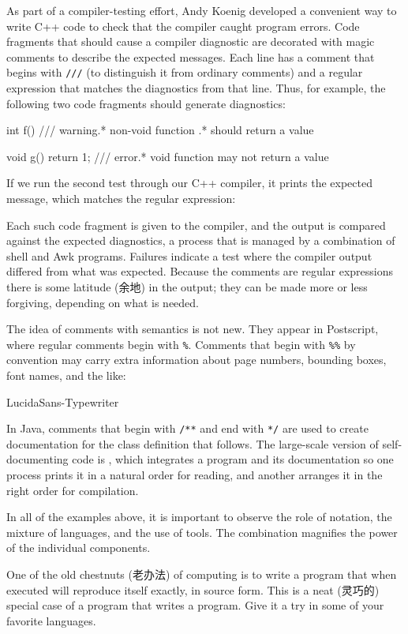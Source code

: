 As part of a compiler-testing effort, Andy Koenig developed a convenient
way to write C++ code to check that the compiler caught program errors.
Code fragments that should cause a compiler diagnostic are decorated with
magic comments to describe the expected messages. Each line has a comment
that begins with \verb'///' (to distinguish it from ordinary comments) and
a regular expression that matches the diagnostics from that line. Thus, for
example, the following two code fragments should generate diagnostics:
\begin{wellcode}
    int f() {}
        /// warning.* non-void function .* should return a value

    void g() { return 1; }
        /// error.* void function may not return a value
\end{wellcode}
If we run the second test through our C++ compiler, it prints the expected
message, which matches the regular expression:

Each such code fragment is given to the compiler, and the output is
compared against the expected diagnostics, a process that is managed by a
combination of shell and Awk programs. Failures indicate a test where the
compiler output differed from what was expected. Because the comments are
regular expressions there is some latitude (余地) in the output; they can
be made more or less forgiving, depending on what is needed.

The idea of comments with semantics is not new. They appear in Postscript,
where regular comments begin with \verb'%'. Comments that begin with
\verb'%%' by convention may carry extra information about page numbers,
bounding boxes, font names, and the like:
\begin{wellcode}
                LucidaSans-Typewriter
\end{wellcode}
In Java, comments that begin with \verb'/**' and end with \verb'*/' are
used to create documentation for the class definition that follows. The
large-scale version of self-documenting code is , which integrates a program and its documentation so one
process prints it in a natural order for reading, and another arranges it
in the right order for compilation.

In all of the examples above, it is important to observe the role of
notation, the mixture of languages, and the use of tools. The combination
magnifies the power of the individual components.

\begin{exercise}
    One of the old chestnuts (老办法) of computing is to write a program
    that when executed will reproduce itself exactly, in source form. This
    is a neat (灵巧的) special case of a program that writes a program.
    Give it a try in some of your favorite languages.
\end{exercise}
